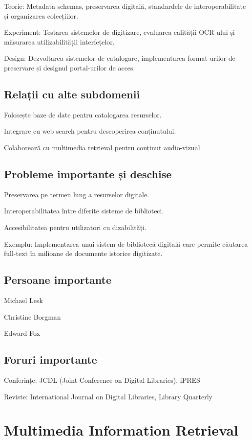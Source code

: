 \documentclass[12pt]{article}
\begin{document}
Teorie: Metadata schemas, preservarea digitală, standardele de interoperabilitate și organizarea colecțiilor.

Experiment: Testarea sistemelor de digitizare, evaluarea calității OCR-ului și măsurarea utilizabilității interfețelor.

Design: Dezvoltarea sistemelor de catalogare, implementarea format-urilor de preservare și designul portal-urilor de acces.

\subsection*{Relații cu alte subdomenii}

Folosește baze de date pentru catalogarea resurselor.

Integrare cu web search pentru descoperirea conținutului.

Colaborează cu multimedia retrieval pentru conținut audio-vizual.

\subsection*{Probleme importante și deschise}

Preservarea pe termen lung a resurselor digitale.

Interoperabilitatea între diferite sisteme de biblioteci.

Accesibilitatea pentru utilizatori cu dizabilități.

Exemplu: Implementarea unui sistem de bibliotecă digitală care permite căutarea full-text în milioane de documente istorice digitizate.

\subsection*{Persoane importante}

Michael Lesk

Christine Borgman

Edward Fox

\subsection*{Foruri importante}

Conferințe: JCDL (Joint Conference on Digital Libraries), iPRES

Reviste: International Journal on Digital Libraries, Library Quarterly

\section{Multimedia Information Retrieval}
\end{document}
